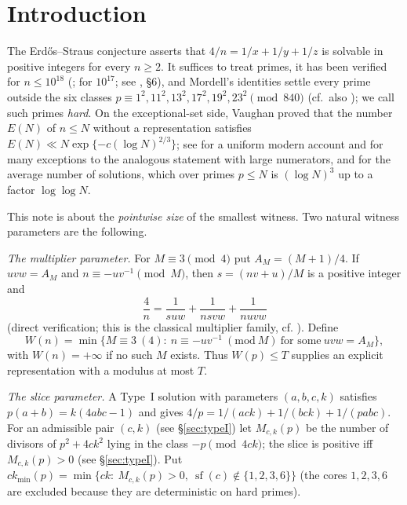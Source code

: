 \documentclass[11pt,reqno]{amsart}
\theoremstyle{definition}
\newcommand{\sfree}{\operatorname{sf}}
\newcommand{\ckmin}{ck_{\min}}
\begin{document}
\section{Introduction}

The Erd\H{o}s--Straus conjecture asserts that $4/n=1/x+1/y+1/z$ is solvable
in positive integers for every $n\ge2$.  It suffices to treat primes, it has
been verified for $n\le10^{18}$ (\cite{MD}; \cite{Salez} for
$10^{17}$; see \cite{PW}, \S6), and Mordell's identities settle every prime outside the six
classes $p\equiv1^2,11^2,13^2,17^2,19^2,23^2\pmod{840}$ \cite{Mordell} (cf.\ also \cite{Oblath}); we
call such primes \emph{hard}.  On the exceptional-set side, Vaughan
\cite{Vaughan} proved that the number $E(N)$ of $n\le N$ without a
representation satisfies $E(N)\ll N\exp\{-c(\log N)^{2/3}\}$; see
\cite{PW} for a uniform modern account and for many exceptions to the
analogous statement with large numerators, and \cite{ET} for the average
number of solutions, which over primes $p\le N$ is $(\log N)^3$ up to a factor
$\log\log N$.

This note is about the \emph{pointwise size} of the smallest witness.  Two
natural witness parameters are the following.

\smallskip\noindent\emph{The multiplier parameter.}  For $M\equiv3\pmod4$ put
$A_M=(M+1)/4$.  If $uvw=A_M$ and $n\equiv-uv^{-1}\pmod M$, then
$s=(nv+u)/M$ is a positive integer and
\begin{equation}\label{eq:ident}
 \frac4n=\frac1{suw}+\frac1{nsvw}+\frac1{nuvw}
\end{equation}
(direct verification; this is the classical multiplier family, cf.
\cite{Vaughan,ET}).  Define
\begin{equation}\label{eq:W}
 W(n)=\min\{M\equiv3\ (4):\ n\equiv-uv^{-1}\ (\mathrm{mod}\ M)\ \text{for some}\ uvw=A_M\},
\end{equation}
with $W(n)=+\infty$ if no such $M$ exists.  Thus $W(p)\le T$ supplies an
explicit representation with a modulus at most $T$.

\smallskip\noindent\emph{The slice parameter.}  A Type~I solution with
parameters $(a,b,c,k)$ satisfies $p(a+b)=k(4abc-1)$ and gives
$4/p=1/(ack)+1/(bck)+1/(pabc)$.  For an admissible pair $(c,k)$ (see
\S\ref{sec:typeI}) let $M_{c,k}(p)$ be the number of divisors of
$p^2+4ck^2$ lying in the class $-p\pmod{4ck}$; the slice is positive iff
$M_{c,k}(p)>0$ (see \S\ref{sec:typeI}).  Put $\ckmin(p)=\min\{ck:\ M_{c,k}(p)>0,\ \sfree(c)\notin\{1,2,3,6\}\}$
(the cores $1,2,3,6$ are excluded because they are deterministic on hard
primes).
\end{document}
